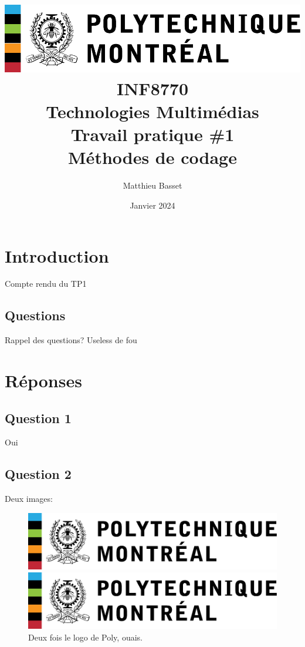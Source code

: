 \documentclass{article}[letterpaper, 11pt]
\title{
    \includegraphics[scale=0.8]{poly-logo.pdf}\\\vspace*{50pt}
    \huge\textbf{INF8770}\\
    \textbf{Technologies Multimédias}\\
    Travail pratique \#1\\
    Méthodes de codage\\
}
\author{\Large Matthieu Basset}
\date{\huge Janvier 2024}
\renewcommand{\thepage}{}
\begin{document}
\thispagestyle{empty}
\maketitle

\newpage

\renewcommand{\thepage}{\arabic{page}}
\pagestyle{fancy}
\renewcommand{\contentsname}{Table des matières}
\setcounter{page}{1}

\tableofcontents


\newpage

\section{Introduction}
Compte rendu du TP1
\subsection{Questions}
Rappel des questions? Useless de fou
\newpage
\section{Réponses}
\subsection{Question 1}
Oui
\subsection{Question 2}

Deux images:

\begin{figure}[h]
	\begin{minipage}[c]{.49\linewidth}
		 \centering
		 \includegraphics[scale = 0.25]{poly-logo.pdf}
	\end{minipage}
	\begin{minipage}[c]{.49\linewidth}
		 \centering
		 \includegraphics[scale = 0.25]{poly-logo.pdf}
	\end{minipage}
		 \caption{ \centering Deux fois le logo de Poly, ouais.}
\end{figure}
\end{document}
